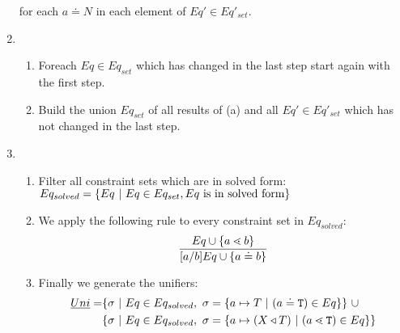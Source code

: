 \begin{enumerate}
      for each $a \doteq N$ in each element of $Eq' \in Eq'_{set}$.

\item 
    \begin{enumerate}
    \item Foreach $Eq \in Eq_{set}$ which has changed in the last step
      start again with the first step.
    \item Build the union $Eq_{set}$ of all results of (a) and all $Eq' \in
      Eq'_{set}$ which has not changed in the last step.
    \end{enumerate}
\item
\begin{enumerate}
  \item Filter all constraint sets which are in solved
  form:\\
$Eq_{solved} = \{  Eq \ | \ Eq \in Eq_{set}, Eq \ \text{is in solved form} \}$
\item We apply the following rule to every constraint set in $Eq_{solved}$:
\begin{align*}
\ddfrac{
  Eq \cup \set{ a \lessdot b } %
}{
  [a/b]Eq \cup \set{ a \doteq b }
}
\end{align*}
\item Finally we generate the unifiers:
\begin{align*}
    \emph{Uni} = &
   \{ \sigma \ | \ Eq \in Eq_{solved},\ \sigma = \{ a \mapsto T \ | \ (a \doteq \texttt{T}) \in Eq \}  \} \ \cup \\
   & \{ \sigma \ | \ Eq \in Eq_{solved},\ \sigma = \{ a \mapsto (X \triangleleft T) \ | \ (a \lessdot \texttt{T}) \in Eq \}  \}
\end{align*}
\end{enumerate}
\end{enumerate}

